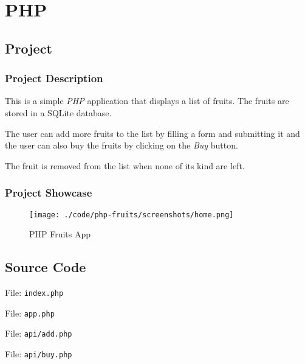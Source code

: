 \section{PHP}\label{sec:php}

\subsection{Project}

\subsubsection*{Project Description}

This is a simple \textit{PHP} application\cite{php-fruits} that displays a list of fruits. The fruits are stored in a SQLite database.

The user can add more fruits to the list by filling a form and submitting it and the user can also buy the fruits by clicking on the \textit{Buy} button.

The fruit is removed from the list when none of its kind are left.

\subsubsection*{Project Showcase}

\begin{figure}[htbp]
    \centering
    \texttt{[image: ./code/php-fruits/screenshots/home.png]}
    \caption{PHP Fruits App}
    \label{fig:php}
\end{figure}


\subsection{Source Code}

File: \texttt{index.php}

File: \texttt{app.php}

\pagebreak

File: \texttt{api/add.php}

File: \texttt{api/buy.php}
